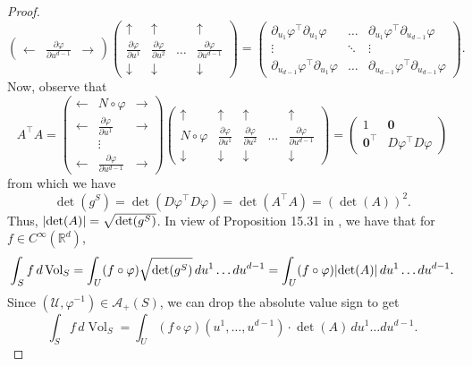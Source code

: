 \documentclass{article}
\renewcommand\det{\operatorname{det}}
\newcommand{\p}{\partial}
\newcommand{\R}{\mathbb{R}}
\newcommand{\f}[2]{\frac{#1}{#2}}
\theoremstyle{theorem}
\newcommand{\Vol}{\operatorname{Vol}}
\begin{document}
\begin{proof}
\begin{equation*}
\begin{pmatrix}
     \leftarrow & \f{\p \varphi}{\p u^{d-1}} & \rightarrow 
    \end{pmatrix} \begin{pmatrix}
    \uparrow & \uparrow &   &\uparrow \\ 
    \f{\p \varphi}{\p u^1}& \f{\p \varphi}{\p u^2}  &\dots&\f{\p \varphi}{\p u^{d-1}}\\
    \downarrow  & \downarrow &    &\downarrow 
    \end{pmatrix} = \begin{pmatrix} 
    \p_{u_1} \varphi^\top \p_{u_1} \varphi & \dots & \p_{u_1}  \varphi^\top \p_{u_{d-1}}\varphi \\
    \vdots & \ddots & \vdots \\
    \p_{u_{d-1}} \varphi^\top \p_{u_1} \varphi & \dots & \p_{u_{d-1}} \varphi^\top \p_{u_{d-1}}\varphi 
    \end{pmatrix}.
\end{equation*}
Now, observe that
\begin{equation*}
    A^\top A = \begin{pmatrix}
    \leftarrow& N \circ \varphi & \rightarrow\\
    \leftarrow & \f{\p \varphi}{\p u^1} &\rightarrow \\
    &\vdots& \\
    \leftarrow & \f{\p \varphi}{\p u^{d-1}} & \rightarrow
    \end{pmatrix}
    \begin{pmatrix}
    \uparrow &\uparrow & \uparrow &   &\uparrow \\ 
    N \circ \varphi &\f{\p \varphi}{\p u^1}& \f{\p \varphi}{\p u^2}  &\dots&\f{\p \varphi}{\p u^{d-1}}\\
    \downarrow  &\downarrow  & \downarrow &    &\downarrow
    \end{pmatrix} = 
    \begin{pmatrix}
    1 & \mathbf{0} \\ \mathbf{0}^\top & D\varphi^\top D\varphi
    \end{pmatrix}
\end{equation*}
from which we have
\begin{equation*}
    \det(g^S) = \det(D\varphi^\top D\varphi) = \det(A^\top A) = (\det(A))^2.
\end{equation*}
Thus, $\abs{\det(A)} = \sqrt{\det(g^S)}$. In view of Proposition 15.31 in \cite{lee2013smooth}, we have that for $f\in C^\infty(\R^d)$,
\begin{equation*}
    \int_S f\,d \Vol_S = \int_{U} (f\circ \varphi) \sqrt{\det(g^S)} \,du^1\dots du^{d-1} = \int_{U} (f\circ \varphi) \abs{\det(A)} \,du^1\dots du^{d-1}.
\end{equation*}
Since $(\mathcal{U}, \varphi^{-1}) \in \mathcal{A}_+(S)$, we can drop the absolute value sign to get 
\begin{equation*}
    \int_S f\,d \Vol_S  = \int_{U} (f\circ \varphi)(u^1,\dots,u^{d-1}) \cdot {\det(A)} \,du^1\dots du^{d-1}.
\end{equation*}
\end{proof}
\end{document}
